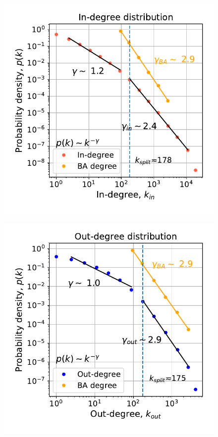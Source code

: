 \documentclass[12pt, twoside]{report}
\begin{document}
    
\begin{minipage}[b]{0.5\textwidth}
   \centering
    \begin{figure}[H]
      \includegraphics[width=\textwidth]{../../scripts/visualization/imgs/in_degree_distribution.pdf}            
          \caption{}
        \label{fig:in_degree}
\end{figure}
\end{minipage}
\begin{minipage}[b]{0.5\textwidth}
  \begin{figure}[H]
  \centering
  \includegraphics[width=\textwidth]{../../scripts/visualization/imgs/out_degree_distribution.pdf}            
        \caption{}
\label{fig:out_degree}
\end{figure}
\end{minipage}
    
\end{document}
